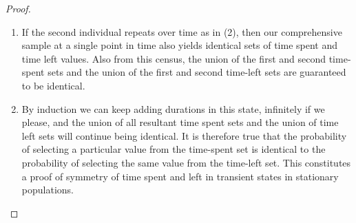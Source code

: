 \documentclass[12pt,oneside,a4paper]{article} %
\theoremstyle{definition}
\begin{document}
\begin{proof}
\begin{enumerate}
\item{} If the second individual repeats over time as in (2), then our
comprehensive sample at a single point in time also yields identical sets
of time spent and time left values. Also from this census, the union of the
first and second time-spent sets and the union of the first and second time-left sets
are guaranteed to be identical. 

\item{} By induction we can keep adding durations in this state, infinitely if we
please, and the union of all resultant time spent sets and the union of time
left sets will continue being identical. It is therefore true that the
probability of selecting a particular value from the time-spent set is identical
to the probability of selecting the same value from the time-left set. This
constitutes a proof of symmetry of time spent and left in transient states in
stationary populations.
\end{enumerate}
\end{proof}
\end{document}
